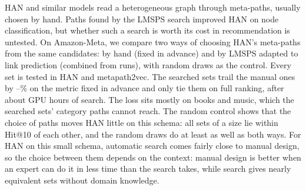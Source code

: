 HAN and similar models read a heterogeneous graph through meta-paths, usually chosen by hand. Paths
found by the LMSPS search improved HAN on node classification, but whether such a search is worth
its cost in recommendation is untested. On Amazon-Meta, we compare two ways of choosing HAN's
meta-paths from the same  candidates: by hand (fixed in advance) and by LMSPS
adapted to link prediction (combined from  runs), with random draws as the
control. Every set is tested in HAN and metapath2vec. The searched sets trail the manual ones by
--\% on the metric fixed in advance and only tie them on
full ranking, after about  GPU hours of search. The loss sits mostly on books
and music, which the searched sets' category paths cannot reach. The random control shows that the
choice of paths moves HAN little on this schema: all sets of a size lie within 
Hit@10 of each other, and the random draws do at least as well as both ways. For HAN on this small
schema, automatic search comes fairly close to manual design, so the choice between them depends on
the context: manual design is better when an expert can do it in less time than the search takes,
while search gives nearly equivalent sets without domain knowledge.

